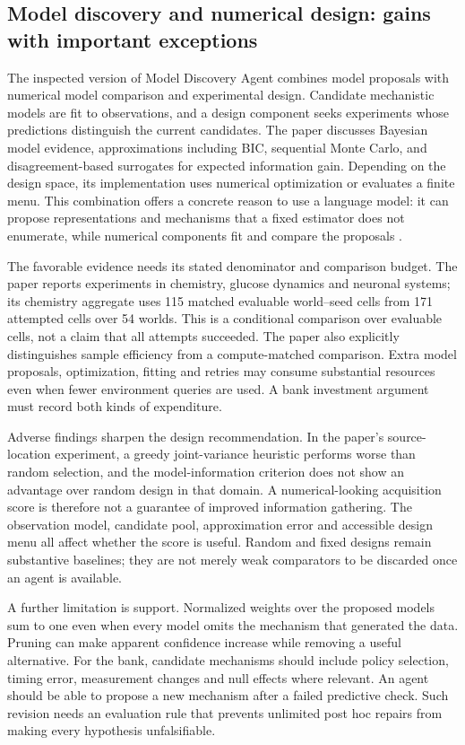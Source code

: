 \subsection{Model discovery and numerical design: gains with important exceptions}

The inspected version of Model Discovery Agent combines model proposals with
numerical model comparison and experimental design. Candidate mechanistic
models are fit to observations, and a design component seeks experiments whose
predictions distinguish the current candidates. The paper discusses Bayesian
model evidence, approximations including BIC, sequential Monte Carlo, and
disagreement-based surrogates for expected information gain. Depending on the
design space, its implementation uses numerical optimization or evaluates a
finite menu. This combination offers a concrete reason to use a language
model: it can propose representations and mechanisms that a fixed estimator
does not enumerate, while numerical components fit and compare the proposals
\cite{v12_la_2608_09696}.

The favorable evidence needs its stated denominator and comparison budget.
The paper reports experiments in chemistry, glucose dynamics and neuronal
systems; its chemistry aggregate uses 115 matched evaluable world--seed cells
from 171 attempted cells over 54 worlds. This is a conditional comparison over
evaluable cells, not a claim that all attempts succeeded. The paper also
explicitly distinguishes sample efficiency from a compute-matched comparison.
Extra model proposals, optimization, fitting and retries may consume substantial
resources even when fewer environment queries are used. A bank investment
argument must record both kinds of expenditure.

Adverse findings sharpen the design recommendation. In the paper's
source-location experiment, a greedy joint-variance heuristic performs worse
than random selection, and the model-information criterion does not show an
advantage over random design in that domain. A numerical-looking acquisition
score is therefore not a guarantee of improved information gathering.
The observation model, candidate pool, approximation error and accessible
design menu all affect whether the score is useful. Random and fixed designs
remain substantive baselines; they are not merely weak comparators to be
discarded once an agent is available.

A further limitation is support. Normalized weights over the proposed models
sum to one even when every model omits the mechanism that generated the data.
Pruning can make apparent confidence increase while removing a useful
alternative. For the bank, candidate mechanisms should include policy
selection, timing error, measurement changes and null effects where relevant.
An agent should be able to propose a new mechanism after a failed predictive
check. Such revision needs an evaluation rule that prevents unlimited
post hoc repairs from making every hypothesis unfalsifiable.

